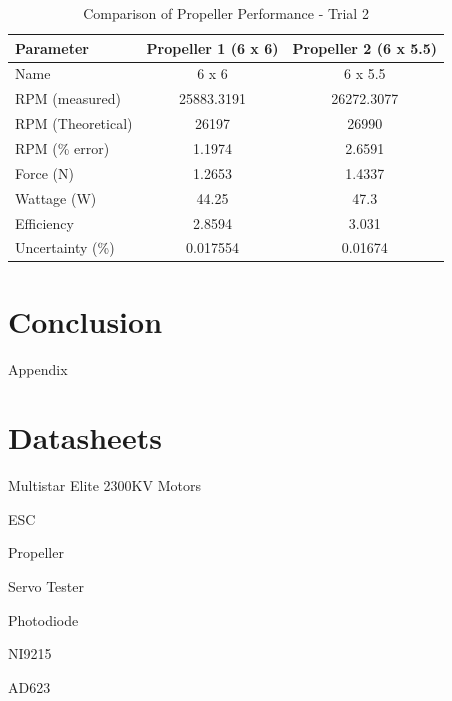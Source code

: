 \documentclass{article}
\begin{document}
\begin{table}[h!]
  \centering
  \begin{tabular}{lcc}
  \hline
  \textbf{Parameter} & \textbf{Propeller 1 (6 x 6)} & \textbf{Propeller 2 (6 x 5.5)} \\
  \hline
  Name & 6 x 6 & 6 x 5.5 \\
  RPM (measured) & 25883.3191 & 26272.3077 \\
  RPM (Theoretical) & 26197 & 26990 \\
  RPM (\% error) & 1.1974 & 2.6591 \\
  Force (N) & 1.2653 & 1.4337 \\
  Wattage (W) & 44.25 & 47.3 \\
  Efficiency & 2.8594 & 3.031 \\
  Uncertainty (\%) & 0.017554 & 0.01674 \\
  \hline
  \end{tabular}
  \caption{Comparison of Propeller Performance - Trial 2}
  \label{table:propeller_performance2}
  \end{table}
  

\section{Conclusion}

\newpage
\thispagestyle{empty}  %
\begin{center}
	\vspace*{\fill}
	{\Huge Appendix}
	\vspace*{\fill}
\end{center}

\newpage
\begin{appendices}
\pagestyle{fancy}
\renewcommand{\thefigure}{A\arabic{figure}}
\setcounter{figure}{0}

\pagebreak

\hypertarget{datasheets}{}
\section{Datasheets}
\begin{enumerate}[label = {[\arabic*]}]
\small
\item \hypertarget{1}{Multistar Elite 2300KV Motors}
\item ESC
\item Propeller
\item Servo Tester
\item Photodiode
\item NI9215
\item AD623


\end{enumerate}

\end{appendices}
\end{document}
